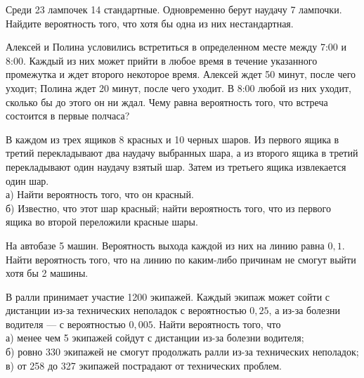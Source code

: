 \newpage\setcounter{zad}{0}



\begin{zkrW}{20}\noindent 
	Среди 23 лампочек 14 стандартные. Одновременно берут наудачу 7 лампочки. Найдите вероятность того, что хотя бы одна из них нестандартная.
 
\end{zkrW}

\begin{zkrW}{20}\noindent 
	Алексей и Полина условились встретиться в определенном месте между 7:00 и 8:00. Каждый из них может прийти в любое время в течение указанного промежутка и ждет второго некоторое время. Алексей ждет 50 минут, после чего уходит; Полина ждет 20 минут, после чего уходит. В 8:00 любой из них уходит, сколько бы до этого он ни ждал. Чему равна вероятность того, что встреча состоится в первые полчаса?
 
\end{zkrW}

\begin{zkrW}{20}\noindent 
	В каждом из трех ящиков 8 красных и 10 черных шаров. Из первого ящика в третий перекладывают два наудачу выбранных шара, а из второго ящика в третий перекладывают один наудачу взятый шар. Затем из третьего ящика извлекается один шар. \\ \indent а) Найти вероятность того, что он красный. \\ \indent б) Известно, что этот шар красный; найти вероятность того, что из первого ящика во второй переложили красные шары.
 
\end{zkrW}

\begin{zkrW}{20}\noindent 
	На автобазе 5 машин. Вероятность выхода каждой из них на линию равна $0{,}1$. Найти вероятность того, что на линию по каким-либо причинам не смогут выйти хотя бы 2 машины.
 
\end{zkrW}

\begin{zkrW}{20}\noindent 
	В ралли принимает участие 1200 экипажей. Каждый экипаж может сойти с дистанции из-за технических неполадок с вероятностью $0{,}25$, а из-за болезни водителя --- с вероятностью $0{,}005$. Найти вероятность того, что \\ \indent а) менее чем 5 экипажей сойдут с дистанции из-за болезни водителя; \\ \indent б) ровно 330 экипажей не смогут продолжать ралли из-за технических неполадок; \\ \indent в) от 258 до 327 экипажей пострадают от технических проблем.
 
\end{zkrW}

